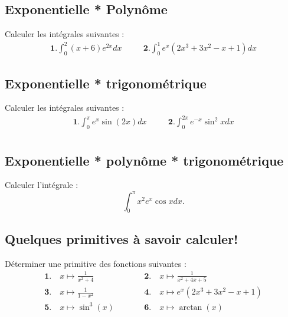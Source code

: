 

\vspace{1em}
\subsection{Exponentielle * Polynôme}

Calculer les intégrales suivantes  :
$$\begin{array}{lcl}
\displaystyle \mathbf{1.}\int_{0}^2 (x+6)e^{2x}dx &\quad&\displaystyle \mathbf{2.} \int_0^1 e^x(2x^3+3x^2-x+1)dx
\end{array}$$




\vspace{1em}
\subsection{Exponentielle * trigonométrique}

Calculer les intégrales suivantes  :
$$\begin{array}{lcl}
\displaystyle \mathbf{1.} \int_0^\pi e^x\sin(2x)dx&\quad&\displaystyle \mathbf{2.} \int_0^{2\pi}e^{-x}\sin^2 xdx\\
\end{array}$$




\vspace{1em}
\subsection{Exponentielle * polynôme * trigonométrique}

Calculer l'intégrale :
$$\int_0^\pi x^2e^x \cos xdx.$$




\vspace{1em}
\subsection{Quelques primitives à savoir calculer!}

Déterminer une primitive des fonctions suivantes :
$$
\begin{array}{lcl}
\displaystyle \mathbf{1.}\quad x\mapsto \frac{1}{x^2+4}&\quad\quad&\displaystyle \mathbf{2.}\quad x\mapsto\frac{1}{x^2+4x+5}\\
\displaystyle \mathbf{3.}\quad x\mapsto \frac{1}{1-x^2}&&\displaystyle \mathbf{4.}\quad x\mapsto e^x(2x^3+3x^2-x+1)\\
\displaystyle \mathbf{5.}\quad x\mapsto\sin^3(x)&&\displaystyle \mathbf{6.}\quad x\mapsto \arctan(x)
\end{array}$$



